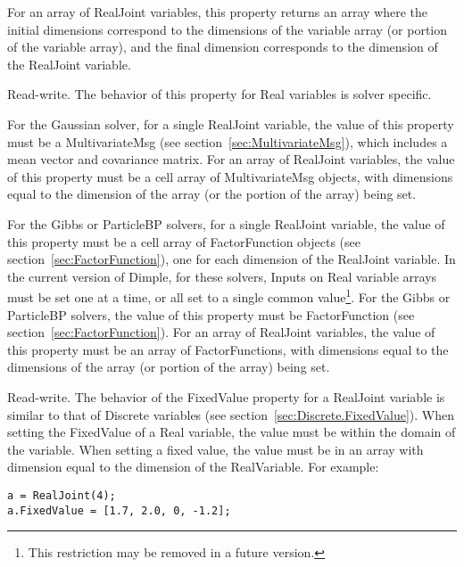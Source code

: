 \ifmatlab
For an array of RealJoint variables, this property returns an array where the initial dimensions correspond to the dimensions of the variable array (or portion of the variable array), and the final dimension corresponds to the dimension of the RealJoint variable.
\fi

\label{sec:RealJoint.Input}

Read-write.  The behavior of this property for Real variables is solver specific.  

For the Gaussian solver, \ifmatlab for a single RealJoint variable, \fi the value of this property must be a MultivariateMsg (see section~\ref{sec:MultivariateMsg}), which includes a mean vector and covariance matrix.  \ifmatlab For an array of RealJoint variables, the value of this property must be a cell array of MultivariateMsg objects, with dimensions equal to the dimension of the array (or the portion of the array) being set. \fi

\ifmatlab
For the Gibbs or ParticleBP solvers, for a single RealJoint variable, the value of this property must be a cell array of FactorFunction objects (see section~\ref{sec:FactorFunction}), one for each dimension of the RealJoint variable.  In the current version of Dimple, for these solvers, Inputs on Real variable arrays must be set one at a time, or all set to a single common value\footnote{This restriction may be removed in a future version.}.
\fi
\ifjava
For the Gibbs or ParticleBP solvers, the value of this property must be FactorFunction (see section~\ref{sec:FactorFunction}).  For an array of RealJoint variables, the value of this property must be an array of FactorFunctions, with dimensions equal to the dimensions of the array (or portion of the array) being set.
\fi

\label{sec:RealJoint.FixedValue}

Read-write.  The behavior of the FixedValue property for a RealJoint variable is similar to that of Discrete variables (see section~\ref{sec:Discrete.FixedValue}).  When setting the FixedValue of a Real variable, the value must be within the domain of the variable.  When setting a fixed value, the value must be in an array with dimension equal to the dimension of the RealVariable.  For example:

\ifmatlab
\begin{lstlisting}
a = RealJoint(4);
a.FixedValue = [1.7, 2.0, 0, -1.2];
\end{lstlisting}
\fi

